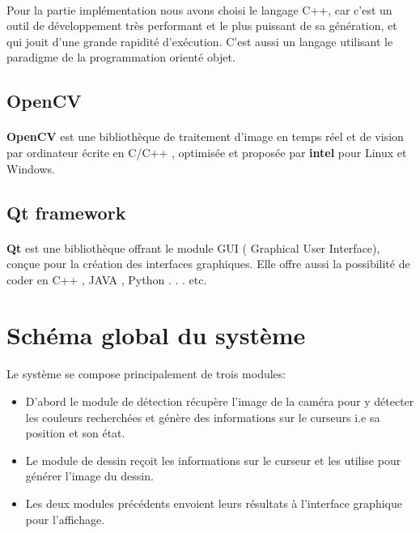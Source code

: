 \documentclass[12pt]{report}
\begin{document}
		\paragraph{}
	
		Pour la partie implémentation nous avons choisi le langage C++, car c'est un outil 
		de développement très performant et le plus puissant de sa génération, et qui jouit
		d'une grande rapidité d'exécution. C'est aussi un langage utilisant le paradigme 
		de la programmation orienté objet.
		
		\subsection{OpenCV}
		\paragraph{}
		\textbf{OpenCV }est une bibliothèque de traitement d'image en temps réel et de vision
		par ordinateur écrite en C/C++ , optimisée et proposée par \textbf{intel} pour Linux et
		Windows.
		\subsection{Qt framework}
		\paragraph{}
		\textbf{Qt} est une bibliothèque offrant le module GUI ( Graphical User Interface),
		conçue pour la création des interfaces graphiques. Elle offre aussi la possibilité
		de coder en C++ , JAVA , Python . . . etc.
	
	\section{Schéma global du système}
	Le système se compose principalement de trois modules:
	
	\begin{itemize}
		\item D’abord le module de détection récupère l’image de la caméra pour y détecter les couleurs recherchées et génère des informations sur le curseurs i.e sa position et son état.
		
		\item Le module de dessin reçoit les informations sur le curseur et les utilise pour générer l’image du dessin.
		
		\item Les deux modules précédents envoient leurs résultats à l’interface graphique pour l’affichage.
	\end{itemize}
	
\end{document}

